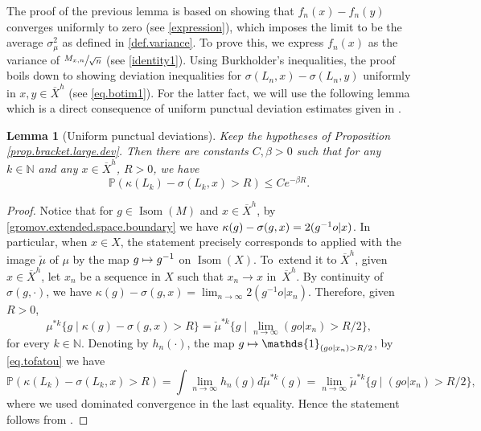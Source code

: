 \documentclass[10pt]{amsart}
\newcommand\mto{\mathchoice{\longmapsto}{\mapsto}{\mapsto}{\mapsto}}
\let\sep\mid
\let\ts\textstyle
\theoremstyle{plain}
\newtheorem{lemma}[theorem]{Lemma}
\theoremstyle{definition}
\newcommand\N{\mathbb{N}}
\DeclareMathOperator\Isom{Isom}
\begin{document}
The proof of the previous lemma is based on showing that $f_n(x)-f_n(y)$ converges uniformly to zero (see \eqref{expression}), which imposes the limit to be the average $\sigma_{\mu}^2$ as defined in \eqref{def.variance}. To prove this, we express $f_n(x)$ as the variance of $\sfrac{M_{x,n}}{\sqrt{n}}$ (see \eqref{identity1}). Using Burkholder's inequalities, the proof boils down to showing deviation inequalities for $\sigma(L_n,x)-\sigma(L_n,y)$ uniformly in $x,y\in \overline{X}^h$ (see \eqref{eq.botim1}). For the latter fact, we will use the following lemma which is a direct consequence of uniform punctual deviation estimates given in \cite[Prop.\,2.12]{BMSS}.

\begin{lemma}[Uniform punctual deviations]\label{lemma.unif.punctual}
Keep the hypotheses of Proposition \ref{prop.bracket.large.dev}. Then there are constants $C, \beta >0$ such that for any $k \in \N$ and any $x \in \overline{X}^h$, $R>0$, we have
\[
\mathbb{P}(\kappa(L_k)-\sigma(L_k,x) > R) \leq C e^{-\beta R}.
\]
\end{lemma}
\begin{proof}
Notice that for $g\in \Isom(M)$ and $x \in \overline{X}^h$, by \eqref{gromov.extended.space.boundary} we have $\kappa(g)-\nobreak\sigma(g,x)=2(g^{-1}o | x)$. In particular, when $x \in X$, the statement precisely corresponds to \hbox{\cite[Prop.\,2.12]{BMSS}} applied with the image $\check{\mu}$ of $\mu$ by the map $g \mto g^{-1}$ on $\Isom(X)$. To~extend it to $\overline{X}^h$, given $x \in \overline{X}^h$, let $x_n$ be a sequence in $X$ such that $x_n \to x$ in~$\overline{X}^h$. By continuity of $\sigma(g,\cdot)$, we have $\kappa(g)-\sigma(g,x)=\lim_{n \to \infty}2(g^{-1}o|x_n)$. Therefore, given $R>0$,
\begin{equation}\label{eq.tofatou}\ts
\mu^{\ast k}\{g \sep \kappa(g)-\sigma(g,x) >R \}=\check{\mu}^{\ast k} \{g \sep \lim_{n \to \infty}(go|x_n) >R/2\},
\end{equation}
for every $k \in \N$. Denoting by $h_n(\cdot)$, the map $g \mto \mathds{1}_{(go|x_n)>R/2}$, by \eqref{eq.tofatou} we have
\[
\mathbb{P}(\kappa(L_k)-\sigma(L_k,x) > R)=\int \lim_{n \to \infty}h_n(g) d\check{\mu}^{\ast k}(g)=\lim_{n \to \infty} \check{\mu}^{\ast k} \{g\sep (go|x_n) >R/2\},
\]
where we used dominated convergence in the last equality.
Hence the statement follows from \cite[Prop.\,2.12]{BMSS}.
\end{proof}
\end{document}
